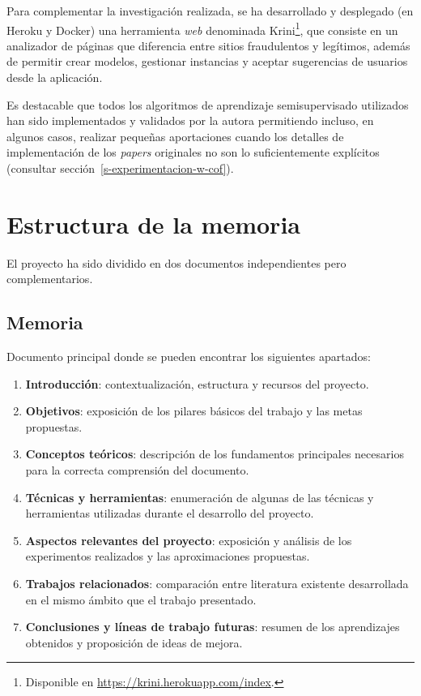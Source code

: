 Para complementar la investigación realizada, se ha desarrollado y desplegado (en Heroku y Docker) una herramienta \textit{web} denominada Krini\footnote{Disponible en \url{https://krini.herokuapp.com/index}.}, que consiste en un analizador de páginas que diferencia entre sitios fraudulentos y legítimos, además de permitir crear modelos, gestionar instancias y aceptar sugerencias de usuarios desde la aplicación.

Es destacable que todos los algoritmos de aprendizaje semisupervisado utilizados han sido implementados y validados por la autora permitiendo incluso, en algunos casos, realizar pequeñas aportaciones cuando los detalles de implementación de los \textit{papers} originales no son lo suficientemente explícitos (consultar sección~\ref{s-experimentacion-w-cof}).


\section{Estructura de la memoria}

El proyecto ha sido dividido en dos documentos independientes pero complementarios.

\subsection{Memoria}

Documento principal donde se pueden encontrar los siguientes apartados:

\begin{enumerate}
	\item \textbf{Introducción}: contextualización, estructura y recursos del proyecto.
	\item \textbf{Objetivos}: exposición de los pilares básicos del trabajo y las metas propuestas.
	\item \textbf{Conceptos teóricos}: descripción de los fundamentos principales necesarios para la correcta comprensión del documento.
	\item \textbf{Técnicas y herramientas}: enumeración de algunas de las técnicas y herramientas utilizadas durante el desarrollo del proyecto.
	\item \textbf{Aspectos relevantes del proyecto}: exposición y análisis de los experimentos realizados y las aproximaciones propuestas.
	\item \textbf{Trabajos relacionados}: comparación entre literatura existente desarrollada en el mismo ámbito que el trabajo presentado.
	\item \textbf{Conclusiones y líneas de trabajo futuras}: resumen de los aprendizajes obtenidos y proposición de ideas de mejora.
\end{enumerate}

